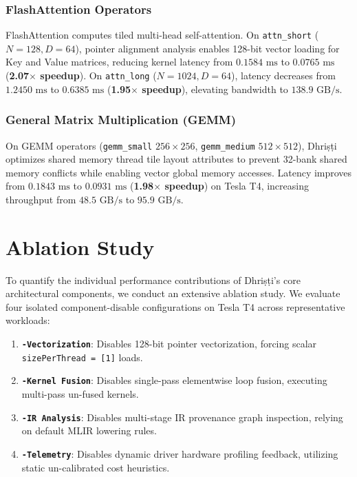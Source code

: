 \documentclass[10pt,journal,compsoc]{IEEEtran}
\begin{document}
\subsubsection{FlashAttention Operators}
FlashAttention computes tiled multi-head self-attention. On \texttt{attn\_short} ($N=128, D=64$), pointer alignment analysis enables 128-bit vector loading for Key and Value matrices, reducing kernel latency from $0.1584\text{ ms}$ to $0.0765\text{ ms}$ (\textbf{2.07$\times$ speedup}). On \texttt{attn\_long} ($N=1024, D=64$), latency decreases from $1.2450\text{ ms}$ to $0.6385\text{ ms}$ (\textbf{1.95$\times$ speedup}), elevating bandwidth to $138.9\text{ GB/s}$.

\subsubsection{General Matrix Multiplication (GEMM)}
On GEMM operators (\texttt{gemm\_small} $256 \times 256$, \texttt{gemm\_medium} $512 \times 512$), Dhri\d{s}\d{t}i optimizes shared memory thread tile layout attributes to prevent 32-bank shared memory conflicts while enabling vector global memory accesses. Latency improves from $0.1843\text{ ms}$ to $0.0931\text{ ms}$ (\textbf{1.98$\times$ speedup}) on Tesla T4, increasing throughput from $48.5\text{ GB/s}$ to $95.9\text{ GB/s}$.

\section{Ablation Study}\label{sec:ablation}

To quantify the individual performance contributions of Dhri\d{s}\d{t}i's core architectural components, we conduct an extensive ablation study. We evaluate four isolated component-disable configurations on Tesla T4 across representative workloads:
\begin{enumerate}
    \item \textbf{\texttt{-Vectorization}}: Disables 128-bit pointer vectorization, forcing scalar \texttt{sizePerThread = [1]} loads.
    \item \textbf{\texttt{-Kernel Fusion}}: Disables single-pass elementwise loop fusion, executing multi-pass un-fused kernels.
    \item \textbf{\texttt{-IR Analysis}}: Disables multi-stage IR provenance graph inspection, relying on default MLIR lowering rules.
    \item \textbf{\texttt{-Telemetry}}: Disables dynamic driver hardware profiling feedback, utilizing static un-calibrated cost heuristics.
\end{enumerate}
\end{document}
